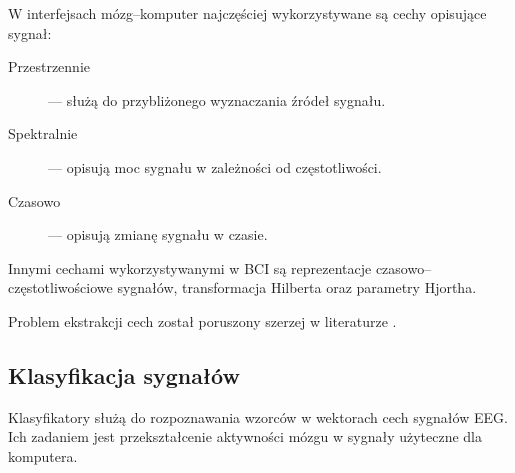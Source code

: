 \documentclass[skorowidz,skroty]{dyplomWEZUT}
\begin{document}
W interfejsach mózg--komputer najczęściej wykorzystywane są cechy opisujące sygnał\cite{eeg_features}:
\begin{description}
    \item [Przestrzennie] --- służą do przybliżonego wyznaczania źródeł sygnału\cite{eeg_features}.
    \item [Spektralnie] --- opisują moc sygnału w zależności od częstotliwości\cite{bci_foundations}.
    \item [Czasowo] --- opisują zmianę sygnału w czasie.
\end{description}
Innymi cechami wykorzystywanymi w BCI są reprezentacje czasowo--czę\-sto\-tli\-wo\-ścio\-we sygnałów, transformacja Hilberta oraz parametry Hjortha\cite{bci_robotics}.

Problem ekstrakcji cech został poruszony szerzej w literaturze \cite{eeg_features,bci_foundations,bci_introduction,bci_robotics,bci_principles}.


\subsection{Klasyfikacja sygnałów}
Klasyfikatory służą do rozpoznawania wzorców w wektorach cech sygnałów EEG. Ich zadaniem jest przekształcenie aktywności mózgu w sygnały użyteczne dla komputera.
\end{document}
